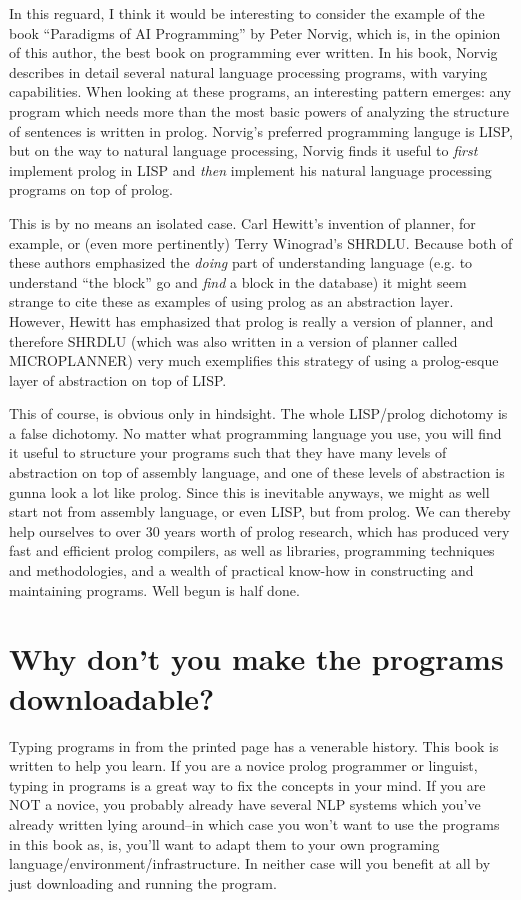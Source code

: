 \documentclass{book}[9pt]
\begin{document}
In this reguard, I think it would be interesting to consider the
example of the book ``Paradigms of AI Programming'' by Peter Norvig,
which is, in the opinion of this author, the best book on programming
ever written.  In his book, Norvig describes in detail several natural
language processing programs, with varying capabilities.  When looking
at these programs, an interesting pattern emerges: any program which
needs more than the most basic powers of analyzing the structure of
sentences is written in prolog.  Norvig's preferred programming
languge is LISP, but on the way to natural language processing, Norvig
finds it useful to {\em first} implement prolog in LISP and {\em then}
implement his natural language processing programs on top of prolog.

This is by no means an isolated case.  Carl Hewitt's invention of
planner, for example, or (even more pertinently) Terry Winograd's
SHRDLU.  Because both of these authors emphasized the {\em doing} part
of understanding language (e.g. to understand ``the block'' go and
{\em find} a block in the database) it might seem strange to cite
these as examples of using prolog as an abstraction layer.  However,
Hewitt has emphasized that prolog is really a version of planner, and
therefore SHRDLU (which was also written in a version of planner
called MICROPLANNER) very much exemplifies this strategy of using a
prolog-esque layer of abstraction on top of LISP.

This of course, is obvious only in hindsight. The whole LISP/prolog
dichotomy is a false dichotomy.  No matter what programming language
you use, you will find it useful to structure your programs such that
they have many levels of abstraction on top of assembly language, and
one of these levels of abstraction is gunna look a lot like prolog.
Since this is inevitable anyways, we might as well start not from
assembly language, or even LISP, but from prolog.  We can thereby help
ourselves to over 30 years worth of prolog research, which has
produced very fast and efficient prolog compilers, as well as
libraries, programming techniques and methodologies, and a wealth of
practical know-how in constructing and maintaining programs.  Well
begun is half done.

\section{Why don't you make the programs downloadable?}

Typing programs in from the printed page has a venerable history.
This book is written to help you learn.  If you are a novice prolog
programmer or linguist, typing in programs is a great way to fix the
concepts in your mind.  If you are NOT a novice, you probably already
have several NLP systems which you've already written lying around--in
which case you won't want to use the programs in this book as, is,
you'll want to adapt them to your own programing
language/environment/infrastructure.  In neither case will you benefit
at all by just downloading and running the program.
\end{document}
